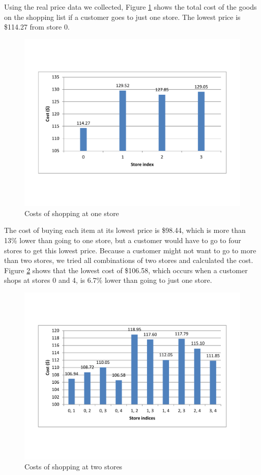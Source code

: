 Using the real price data we collected, Figure \ref{ch2:fcost1store} shows the total cost of the goods on the shopping list if a customer goes to just one store. The lowest price is \$114.27 from store 0.

\begin{figure}
\centering
\includegraphics[scale=0.5]{chap2/chap2-cost1store.pdf}
\caption{Costs of shopping at one store}
\label{ch2:fcost1store}
\end{figure} 

The cost of buying each item at its lowest price is \$98.44, which is more than 13\% lower than going to one store, but a customer would have to go to four stores to get this lowest price. Because a customer might not want to go to more than two stores, we tried all combinations of two stores and calculated the cost. Figure \ref{ch2:fcost2store} shows that the lowest cost of \$106.58, which occurs when a customer shops at stores 0 and 4, is 6.7\% lower than going to just one store.

\begin{figure}
\centering
\includegraphics[scale=0.5]{chap2/chap2-cost2store.pdf}
\caption{Costs of shopping at two stores}
\label{ch2:fcost2store}
\end{figure} 

